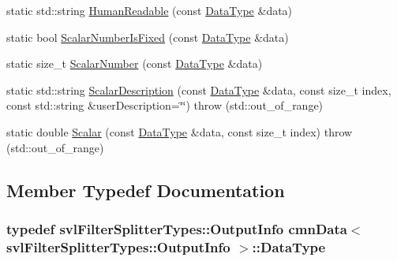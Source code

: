 \begin{DoxyCompactItemize}
\item 
static std\+::string \hyperlink{classcmn_data_3_01svl_filter_splitter_types_1_1_output_info_01_4_ac9f11860ac65609530257506162e1572}{Human\+Readable} (const \hyperlink{classcmn_data_3_01svl_filter_splitter_types_1_1_output_info_01_4_ad3099e3eeadaec326e214501ba10a222}{Data\+Type} \&data)
\item 
static bool \hyperlink{classcmn_data_3_01svl_filter_splitter_types_1_1_output_info_01_4_a68f7a67494f1bbcc8dd67aa92240c329}{Scalar\+Number\+Is\+Fixed} (const \hyperlink{classcmn_data_3_01svl_filter_splitter_types_1_1_output_info_01_4_ad3099e3eeadaec326e214501ba10a222}{Data\+Type} \&data)
\item 
static size\+\_\+t \hyperlink{classcmn_data_3_01svl_filter_splitter_types_1_1_output_info_01_4_a65d65b876b34ec9a4222784ef5612d2b}{Scalar\+Number} (const \hyperlink{classcmn_data_3_01svl_filter_splitter_types_1_1_output_info_01_4_ad3099e3eeadaec326e214501ba10a222}{Data\+Type} \&data)
\item 
static std\+::string \hyperlink{classcmn_data_3_01svl_filter_splitter_types_1_1_output_info_01_4_ab77ab55423500044aa70be80ff4002d2}{Scalar\+Description} (const \hyperlink{classcmn_data_3_01svl_filter_splitter_types_1_1_output_info_01_4_ad3099e3eeadaec326e214501ba10a222}{Data\+Type} \&data, const size\+\_\+t index, const std\+::string \&user\+Description=\char`\"{}\char`\"{})  throw (std\+::out\+\_\+of\+\_\+range)
\item 
static double \hyperlink{classcmn_data_3_01svl_filter_splitter_types_1_1_output_info_01_4_a0706b3241bd9ed094af5a5f90a34e84f}{Scalar} (const \hyperlink{classcmn_data_3_01svl_filter_splitter_types_1_1_output_info_01_4_ad3099e3eeadaec326e214501ba10a222}{Data\+Type} \&data, const size\+\_\+t index)  throw (std\+::out\+\_\+of\+\_\+range)
\end{DoxyCompactItemize}


\subsection{Member Typedef Documentation}
\hypertarget{classcmn_data_3_01svl_filter_splitter_types_1_1_output_info_01_4_ad3099e3eeadaec326e214501ba10a222}{}
\subsubsection[{Data\+Type}]{\setlength{\rightskip}{0pt plus 5cm}typedef {\bf svl\+Filter\+Splitter\+Types\+::\+Output\+Info} {\bf cmn\+Data}$<$ {\bf svl\+Filter\+Splitter\+Types\+::\+Output\+Info} $>$\+::{\bf Data\+Type}}\label{classcmn_data_3_01svl_filter_splitter_types_1_1_output_info_01_4_ad3099e3eeadaec326e214501ba10a222}



